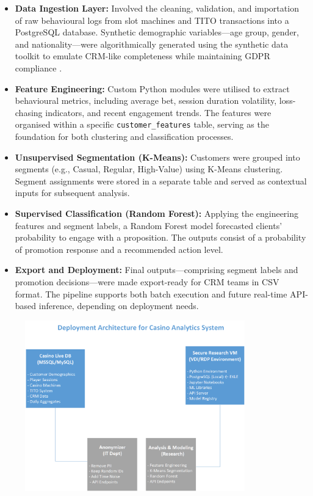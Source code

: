 \documentclass[12pt,a4paper]{report}
\begin{document}
\begin{itemize}
    \item \textbf{Data Ingestion Layer:} Involved the cleaning, validation, and importation of raw behavioural logs from slot machines and TITO transactions into a PostgreSQL database. Synthetic demographic variables—age group, gender, and nationality—were algorithmically generated using the synthetic data toolkit to emulate CRM-like completeness while maintaining GDPR compliance \citep{faker2025}.

    \item \textbf{Feature Engineering:} Custom Python modules were utilised to extract behavioural metrics, including average bet, session duration volatility, loss-chasing indicators, and recent engagement trends. The features were organised within a specific \texttt{customer\_features} table, serving as the foundation for both clustering and classification processes.

    \item \textbf{Unsupervised Segmentation (K-Means):} Customers were grouped into segments (e.g., Casual, Regular, High-Value) using K-Means clustering. Segment assignments were stored in a separate table and served as contextual inputs for subsequent analysis.

    \item \textbf{Supervised Classification (Random Forest):} Applying the engineering features and segment labels, a Random Forest model forecasted clients' probability to engage with a proposition.  The outputs consist of a probability of promotion response and a recommended action level.

    \item \textbf{Export and Deployment:} Final outputs—comprising segment labels and promotion decisions—were made export-ready for CRM teams in CSV format. The pipeline supports both batch execution and future real-time API-based inference, depending on deployment needs.

\end{itemize}

\begin{figure}[H]
\centering
\includegraphics[width=0.85\textwidth]{figures/casino_analytics_system.png}
\label{fig:deployment-architecture}
\end{figure}
\end{document}
